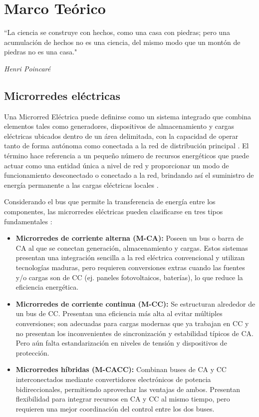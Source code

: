 \cleardoublepage                                 
\chapter{Marco Teórico}
\label{sec:marco-teorico}
\epigraph{``La ciencia se construye con hechos, como una casa con piedras; pero
una acumulación de hechos no es una ciencia, del mismo modo que un montón de
piedras no es una casa."}{\textit{Henri Poincaré}}

\section{Microrredes eléctricas}
\label{sec:microrredes_elec}
Una Microrred Eléctrica puede definirse como un sistema integrado que combina elementos tales como generadores, dispositivos de almacenamiento y cargas eléctricas ubicados dentro de un área delimitada, con la capacidad de operar tanto de forma autónoma como conectada a la red de distribución principal \cite{Olulope2022}. El término hace referencia a un pequeño número de recursos energéticos que puede actuar como una entidad única a nivel de red y proporcionar un modo de funcionamiento desconectado o conectado a la red, brindando así el suministro de energía permanente a las cargas eléctricas locales \cite{Uddin2023}.

Considerando el bus que permite la transferencia de energía entre los componentes, las microrredes eléctricas pueden clasificarse en tres tipos fundamentales \cite{Kim2023,Lei2025}:

\begin{itemize}
    \item \textbf{Microrredes de corriente alterna (M-CA):} Poseen un bus o barra de CA al que se conectan generación, almacenamiento y cargas. Estos sistemas presentan una integración sencilla a la red eléctrica convencional y utilizan tecnologías maduras, pero requieren conversiones extras cuando las fuentes y/o cargas son de CC (ej. paneles fotovoltaicos, baterías), lo que reduce la eficiencia energética.
    \item \textbf{Microrredes de corriente continua (M-CC):} Se estructuran alrededor de un bus de CC. Presentan una eficiencia más alta al evitar múltiples conversiones; son adecuadas para cargas modernas que ya trabajan en CC y no presentan los inconvenientes de sincronización y estabilidad típicos de CA. Pero aún falta estandarización en niveles de tensión y dispositivos de protección.
    \item \textbf{Microrredes híbridas (M-CACC):} Combinan buses de CA y CC interconectados mediante convertidores electrónicos de potencia bidireccionales, permitiendo aprovechar las ventajas de ambos. Presentan flexibilidad para integrar recursos en CA y CC al mismo tiempo, pero requieren una mejor coordinación del control entre los dos buses.
\end{itemize}

